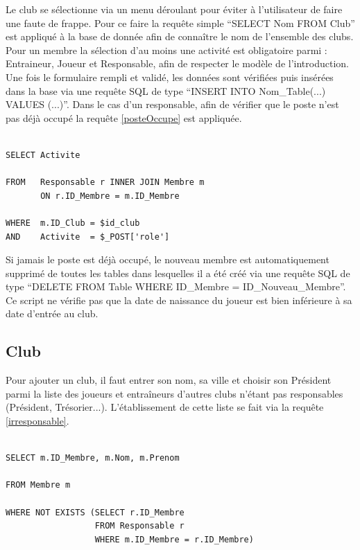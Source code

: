 \documentclass[a4paper»,8pt,french,fleqn]{report}
\begin{document}
Le club se sélectionne via un menu déroulant pour éviter à l'utilisateur de faire une faute de frappe. Pour ce faire la requête simple ``SELECT Nom FROM Club'' est appliqué à la base de donnée afin de connaître le nom de l'ensemble des clubs. \\

 Pour un membre la sélection d'au moins une activité est obligatoire parmi : Entraineur, Joueur et Responsable, afin de respecter le modèle de l'introduction. Une fois le formulaire rempli et validé, les données sont vérifiées puis insérées dans la base via une requête SQL de type ``INSERT INTO Nom\_Table(...) VALUES (...)''. Dans le cas d'un responsable, afin de vérifier que le poste n'est pas déjà occupé la requête \ref{posteOccupe} est appliquée.

\begin{lstlisting}

SELECT Activite

FROM   Responsable r INNER JOIN Membre m
       ON r.ID_Membre = m.ID_Membre

WHERE  m.ID_Club = $id_club
AND    Activite  = $_POST['role']

\end{lstlisting}  

Si jamais le poste est déjà occupé, le nouveau membre est automatiquement supprimé de toutes les tables dans lesquelles il a été créé via une requête SQL de type ``DELETE FROM Table WHERE ID\_Membre = ID\_Nouveau\_Membre''. Ce script ne vérifie pas que la date de naissance du joueur est bien inférieure à sa date d'entrée au club.

\subsection{Club}
Pour ajouter un club, il faut entrer son nom, sa ville et choisir son Président parmi la liste des joueurs et entraîneurs d'autres clubs n'étant pas responsables (Président, Trésorier...). L'établissement de cette liste se fait via la requête \ref{irresponsable}.

\begin{lstlisting}

SELECT m.ID_Membre, m.Nom, m.Prenom 

FROM Membre m

WHERE NOT EXISTS (SELECT r.ID_Membre 
                  FROM Responsable r 
                  WHERE m.ID_Membre = r.ID_Membre)

\end{lstlisting}  
\end{document}
